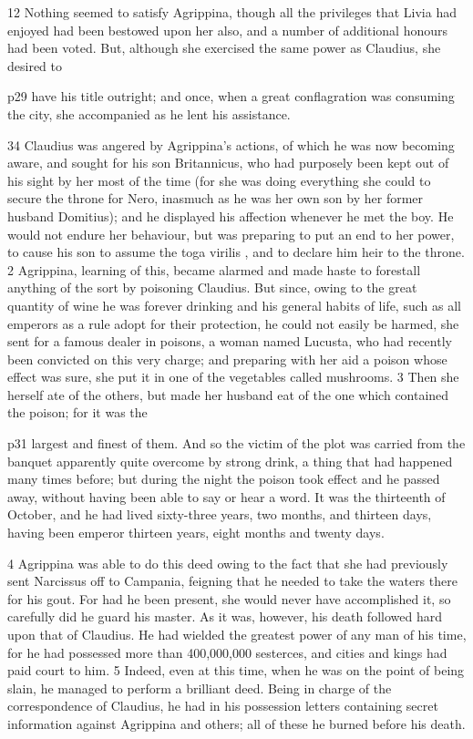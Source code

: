 12
Nothing seemed to satisfy Agrippina, though all the privileges that Livia had enjoyed had been bestowed upon her also, and a number of additional honours had been voted. But, although she exercised the same power as Claudius, she desired to

p29 have his title outright; and once, when a great conflagration was consuming the city, she accompanied as he lent his assistance.

34
Claudius was angered by Agrippina's actions, of which he was now becoming aware, and sought for his son Britannicus, who had purposely been kept out of his sight by her most of the time (for she was doing everything she could to secure the throne for Nero, inasmuch as he was her own son by her former husband Domitius); and he displayed his affection whenever he met the boy. He would not endure her behaviour, but was preparing to put an end to her power, to cause his son to assume the toga virilis , and to declare him heir to the throne. 2 Agrippina, learning of this, became alarmed and made haste to forestall anything of the sort by poisoning Claudius. But since, owing to the great quantity of wine he was forever drinking and his general habits of life, such as all emperors as a rule adopt for their protection, he could not easily be harmed, she sent for a famous dealer in poisons, a woman named Lucusta, who had recently been convicted on this very charge; and preparing with her aid a poison whose effect was sure, she put it in one of the vegetables called mushrooms. 3 Then she herself ate of the others, but made her husband eat of the one which contained the poison; for it was the

p31 largest and finest of them. And so the victim of the plot was carried from the banquet apparently quite overcome by strong drink, a thing that had happened many times before; but during the night the poison took effect and he passed away, without having been able to say or hear a word. It was the thirteenth of October, and he had lived sixty-three years, two months, and thirteen days, having been emperor thirteen years, eight months and twenty days.

4
Agrippina was able to do this deed owing to the fact that she had previously sent Narcissus off to Campania, feigning that he needed to take the waters there for his gout. For had he been present, she would never have accomplished it, so carefully did he guard his master. As it was, however, his death followed hard upon that of Claudius. He had wielded the greatest power of any man of his time, for he had possessed more than 400,000,000 sesterces, and cities and kings had paid court to him. 5 Indeed, even at this time, when he was on the point of being slain, he managed to perform a brilliant deed. Being in charge of the correspondence of Claudius, he had in his possession letters containing secret information against Agrippina and others; all of these he burned before his death.

